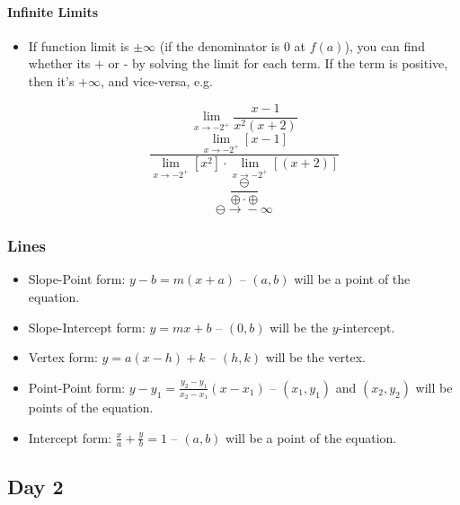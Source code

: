 \documentclass[12pt]{article}
\def\Plus{\texttt{+}}
\def\Minus{\texttt{-}}
\begin{document}
\paragraph{Infinite Limits}
\begin{itemize}
    \item If function limit is $\pm \infty$ (if the denominator is 0 at $f(a)$), you can find whether its $\Plus{}$ or $\Minus{}$ by solving the limit for each term. If the term is positive, then it's $+ \infty$, and vice-versa, e.g.
    
    $$\lim_{x \to -2^+} \frac{x-1}{x^2(x+2)}$$
    $$\frac{\lim_{x \to -2^+} [x-1]}{\lim_{x \to -2^+} [x^2] \cdot \lim_{x \to -2^+} [(x+2)]}$$
    $$\frac{\ominus}{\oplus \cdot \oplus}$$
    $$\ominus \rightarrow{} -\infty$$

\end{itemize}

\subsubsection{Lines}
\begin{itemize}
    \item Slope-Point form: $y-b = m(x+a)$ -- $(a,b)$ will be a point of the equation.
    \item Slope-Intercept form: $y = mx + b$ -- $(0,b)$ will be the $y$-intercept.
    \item Vertex form: $y = a(x-h)+k$ -- $(h,k)$ will be the vertex.
    \item Point-Point form: $y-y_1=\frac{y_2-y_1}{x_2-x_1}(x-x_1)$ -- $(x_1,y_1)$ and $(x_2,y_2)$ will be points of the equation.
    \item Intercept form:  $\frac{x}{a} + \frac{y}{b} = 1$  -- $(a, b)$ will be a point of the equation.
    
\end{itemize}

\subsection{Day 2}
\end{document}
